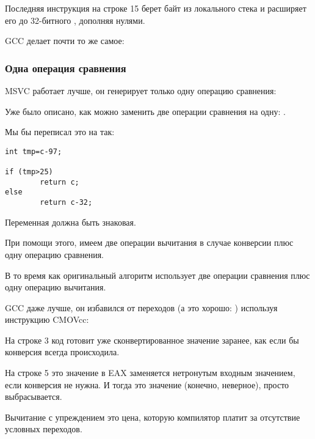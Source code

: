 Последняя инструкция  на строке 15 берет байт из локального стека и расширяет его 
до 32-битного \Tint, дополняя нулями.

\NonOptimizing GCC делает почти то же самое:



\subsubsection{Одна операция сравнения}
\label{toupper_one_comparison}

\Optimizing MSVC работает лучше, он генерирует только одну операцию сравнения:



Уже было описано, как можно заменить две операции сравнения на одну: .

Мы бы переписал это на \CCpp так:

\begin{lstlisting}[style=customc]
int tmp=c-97;

if (tmp>25)
        return c;
else
        return c-32;
\end{lstlisting}

Переменная  должна быть знаковая.

При помощи этого, имеем две операции вычитания в случае конверсии плюс одну операцию сравнения.

В то время как оригинальный алгоритм использует две операции сравнения плюс одну операцию вычитания.

\Optimizing GCC 
даже лучше, он избавился от переходов (а это хорошо: ) используя инструкцию CMOVcc:



На строке 3 код готовит уже сконвертированное значение заранее, как если бы конверсия всегда происходила.

На строке 5 это значение в EAX заменяется нетронутым входным значением, если конверсия не нужна.
И тогда это значение (конечно, неверное), просто выбрасывается.

Вычитание с упреждением это цена, которую компилятор платит за отсутствие условных переходов.

